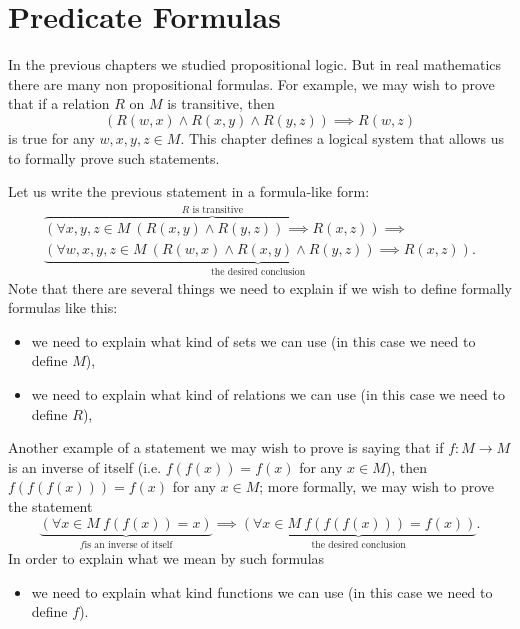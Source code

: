 \chapter{Predicate Formulas}
\label{chapter:predicate-formulas}

In the previous chapters we studied propositional logic. But in real mathematics
there are many non propositional formulas. For example, we may wish to prove
that if a relation $R$ on $M$ is transitive, then
\[
  (R(w, x) \land R(x, y) \land R(y, z)) \implies R(w, z)
\]
is true for any $w, x, y, z \in M$. This chapter defines a logical
system that allows us to formally prove such statements.

Let us write the previous statement in a formula-like form:
\begin{multline*}
    \overbrace{
        \left(
          \forall x, y, z \in M ~ (R(x, y) \land R(y, z)) \implies R(x, z)
         \right)
    }^{R \text{ is transitive}} \implies \\
    \underbrace{(
        \forall w, x, y, z \in M ~ (R(w, x) \land R(x, y) \land R(y, z))
        \implies
        R(x, z)
    )}_\text{the desired conclusion}.
\end{multline*}
Note that there are several things we need to explain if we wish to define
formally formulas like this:
\begin{itemize}
    \item we need to explain what kind of sets we can use (in this case we need
        to define $M$),
    \item we need to explain what kind of relations we can use (in this case we
        need to define $R$),
\end{itemize}

Another example of a statement we may wish to prove is saying that if
$f : M \to M$ is an inverse of itself (i.e. $f(f(x)) = f(x)$ for any $x \in M$),
then $f(f(f(x))) = f(x)$ for any $x \in M$; more formally, we may wish to prove
the statement
\[
    \underbrace{
        (\forall x \in M ~ f(f(x)) = x)}_{f \text{is an inverse of itself}}
    \implies
    \underbrace{
        (\forall x \in M ~ f(f(f(x))) = f(x))
    }_\text{the desired conclusion}.
\]
In order to explain what we mean by such formulas
\begin{itemize}
  \item we need to explain what kind functions we can use (in this case we need
    to define $f$).
\end{itemize}

